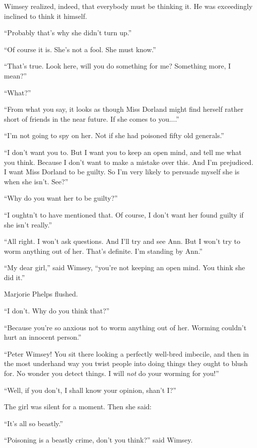 Wimsey realized, indeed, that everybody must be thinking it. He was exceedingly inclined to think it himself.

\enquote{Probably that's why she didn't turn up.}

\enquote{Of course it is. She's not a fool. She must know.}

\enquote{That's true. Look here, will you do something for me? Something more, I mean?}

\enquote{What?}

\enquote{From what you say, it looks as though Miss Dorland might find herself rather short of friends in the near future. If she comes to you....}

\enquote{I'm not going to spy on her. Not if she had poisoned fifty old generals.}

\enquote{I don't want you to. But I want you to keep an open mind, and tell me what you think. Because I don't want to make a mistake over this. And I'm prejudiced. I want Miss Dorland to be guilty. So I'm very likely to persuade myself she is when she isn't. See?}

\enquote{Why do you want her to be guilty?}

\enquote{I oughtn't to have mentioned that. Of course, I don't want her found guilty if she isn't really.}

\enquote{All right. I won't ask questions. And I'll try and see Ann. But I won't try to worm anything out of her. That's definite. I'm standing by Ann.}

\enquote{My dear girl,} said Wimsey, \enquote{you're not keeping an open mind. You think she did it.}

Marjorie Phelps flushed.

\enquote{I don't. Why do you think that?}

\enquote{Because you're so anxious not to worm anything out of her. Worming couldn't hurt an innocent person.}

\enquote{Peter Wimsey! You sit there looking a perfectly well-bred imbecile, and then in the most underhand way you twist people into doing things they ought to blush for. No wonder you detect things. I will \textit{not} do your worming for you!}

\enquote{Well, if you don't, I shall know your opinion, shan't I?}

The girl was silent for a moment. Then she said:

\enquote{It's all so beastly.}

\enquote{Poisoning is a beastly crime, don't you think?} said Wimsey.

